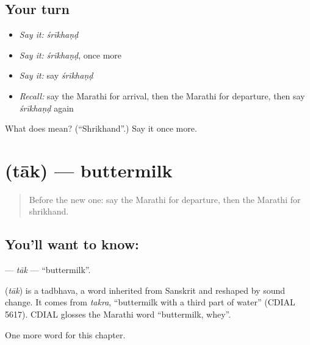 \subsection*{Your turn}
\begin{itemize}
\raggedright
  \item \emph{Say it:} \emph{śrīkhaṇḍ}
  \item \emph{Say it:} \emph{śrīkhaṇḍ}, once more
  \item \emph{Say it:} say \emph{śrīkhaṇḍ}
  \item \emph{Recall:} say the Marathi for arrival, then the Marathi for departure, then say \emph{śrīkhaṇḍ} again
\end{itemize}

\begin{tcolorbox}[breakable,colback=teal!4,colframe=teal!35!black,title={Before you move on}]
What does  mean? (\textquotedblleft{}Shrikhand\textquotedblright{}.) Say it once more.
\end{tcolorbox}
\section[\texorpdfstring{\mr{ताक} (tāk)}{ताक (tāk)}]{ (tāk) — buttermilk}

\label{lesson:MR-C216-tak}



\begin{quote}
Before the new one: say the Marathi for departure, then the Marathi for shrikhand.
\end{quote}

\subsection*{You'll want to know: }
\textbf{} — \emph{tāk} — \textquotedblleft{}buttermilk\textquotedblright{}.

\begin{cousinweb}
\textbf{} (\emph{tāk}) is a tadbhava, a word inherited from Sanskrit and reshaped by sound change. It comes from \emph{takra}, \textquotedblleft{}buttermilk with a third part of water\textquotedblright{} (CDIAL 5617). CDIAL glosses the Marathi word \textquotedblleft{}buttermilk, whey\textquotedblright{}.
\end{cousinweb}

\begin{grammarlens}[title={What you've built}]
One more word for this chapter.
\end{grammarlens}

